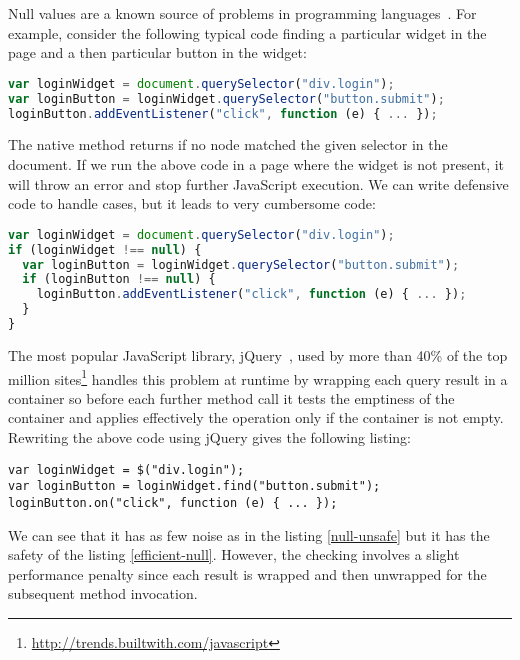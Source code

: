 \documentclass[american,english,runningheads]{llncs}
\begin{document}
Null values are a known source of problems in programming languages~\cite{Hoare09_Null,Nanda09_Null}. For example, consider the following typical code finding a particular widget in the page and a then particular button in the widget:

\begin{lstlisting}[language=JavaScript,label=null-unsafe,caption=Unsafe code]
var loginWidget = document.querySelector("div.login");
var loginButton = loginWidget.querySelector("button.submit");
loginButton.addEventListener("click", function (e) { ... });
\end{lstlisting}

The native  method returns  if no node matched the given selector in the document. If we run the above code in a page where the widget is not present, it will throw an error and stop further JavaScript execution. We can write defensive code to handle  cases, but it leads to very cumbersome code:

\begin{lstlisting}[language=JavaScript,label=efficient-null,caption=Defensive programming to handle null references]
var loginWidget = document.querySelector("div.login");
if (loginWidget !== null) {
  var loginButton = loginWidget.querySelector("button.submit");
  if (loginButton !== null) {
    loginButton.addEventListener("click", function (e) { ... });
  }
}
\end{lstlisting}

The most popular JavaScript library, jQuery~\cite{Bibeault08_jQuery}, used by more than 40\% of the top million sites\footnote{\href{http://trends.builtwith.com/javascript}{http://trends.builtwith.com/javascript}} handles this problem at runtime by wrapping each query result in a container so before each further method call it tests the emptiness of the container and applies effectively the operation only if the container is not empty. Rewriting the above code using jQuery gives the following listing:

\begin{lstlisting}
var loginWidget = $("div.login");
var loginButton = loginWidget.find("button.submit");
loginButton.on("click", function (e) { ... });
\end{lstlisting}

We can see that it has as few noise as in the listing \ref{null-unsafe} but it has the safety of the listing \ref{efficient-null}. However, the checking involves a slight performance penalty since each result is wrapped and then unwrapped for the subsequent method invocation.
\end{document}
